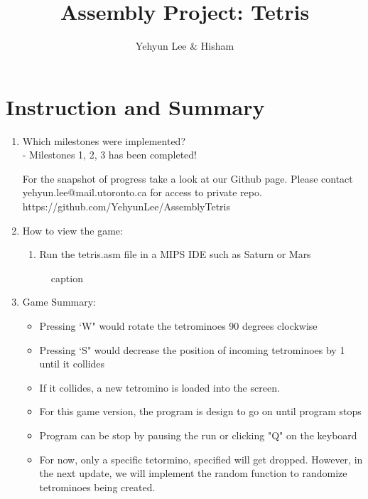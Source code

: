 \documentclass{article}
\title{Assembly Project: Tetris}
\author{Yehyun Lee & Hisham}
\begin{document}
\maketitle

\section{Instruction and Summary}

\begin{enumerate}

    \item Which milestones were implemented? \\
    - Milestones 1, 2, 3 has been completed!

    For the snapshot of progress take a look at our Github page. Please contact yehyun.lee@mail.utoronto.ca for access to private repo.
    https://github.com/YehyunLee/AssemblyTetris

    \item How to view the game:
    
    \begin{enumerate}

    \item Run the tetris.asm file in a MIPS IDE such as Saturn or Mars


    \end{enumerate}

    

\begin{figure}[ht!]
    \centering
    \caption{caption}
    \label{Instructions}
\end{figure}

\item Game Summary:
\begin{itemize}
\item Pressing `W" would rotate the tetrominoes 90 degrees clockwise
\item Pressing `S" would decrease the position of incoming tetrominoes by 1 until it collides
\item If it collides, a new tetromino is loaded into the screen.
\item For this game version, the program is design to go on until program stops 
\item Program can be stop by pausing the run or clicking "Q" on the keyboard
\item For now, only a specific tetormino, specified will get dropped. However, in the next update, we will implement the random function to randomize tetrominoes being created.
\end{itemize}


\end{enumerate}
\end{document}
